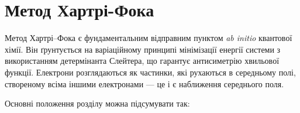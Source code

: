 
\chapter{Метод Хартрі-Фока}\label{\currfilebase}




%




Метод Хартрі--Фока є фундаментальним відправним пунктом \textit{ab initio} квантової хімії.
Він ґрунтується на варіаційному принципі мінімізації енергії системи з використанням детермінанта Слейтера, що гарантує антисиметрію хвильової функції.
Електрони розглядаються як частинки, які рухаються в середньому полі, створеному всіма іншими електронами --- це і є наближення середнього поля.

Основні положення розділу можна підсумувати так:

